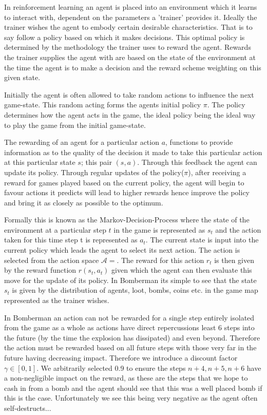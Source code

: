 In reinforcement learning an agent is placed into an environment which it learns to interact with, dependent on the parameters a 'trainer' provides it. Ideally the trainer wishes the agent to embody certain desirable characteristics. That is to say follow a policy based on which it makes decisions. This optimal policy is determined by the methodology the trainer uses to reward the agent. Rewards the trainer supplies the agent with are based on the state of the environment at the time the agent is to make a decision and the reward scheme weighting on this given state. 

Initially the agent is often allowed to take random actions to influence the next game-state. This random acting forms the agents initial policy $\pi$. The policy determines how the agent acts in the game, the ideal policy being the ideal way to play the game from the initial game-state.

The rewarding of an agent for a particular action $a$, functions to provide information as to the quality of the decision it made to take this particular action at this particular state $s$; this  pair $(s, a)$. Through this feedback the agent can update its policy. Through regular updates of the policy($\pi$), after receiving a reward for games played based on the current policy, the agent will begin to favour actions it predicts will lead to higher rewards hence improve the policy and bring it as closely as possible to the optimum.

Formally this is known as the Markov-Decision-Process where the state of the environment at a particular step $t$ in the game is represented as $s_t$ and the action taken for this time step t is represented as $a_t$. The current state is input into the current policy which leads the agent to select its next action. The action is selected from the action space $\mathcal{A} = $. The reward for this action $r_t$ is then given by the reward function $r(s_t, a_t)$ given which the agent can then evaluate this move for the update of its policy. In Bomberman its simple to see that the state $s_t$ is given by the distribution of agents, loot, bombs, coins etc. in the game map represented as the trainer wishes. 

In Bomberman an action can not be rewarded for a single step entirely isolated from the game as a whole as actions have direct repercussions least 6 steps into the future (by the time the explosion has dissipated) and even beyond. Therefore the action must be rewarded based on all future steps with those very far in the future having decreasing impact. Therefore we introduce a discount factor $\gamma \in [0, 1]$. We arbitrarily selected 0.9 to ensure the steps $n+4, n+5, n+6$ have a non-negligible impact on the reward, as these are the steps that we hope to cash in from a bomb and the agent should see that this was a well placed bomb if this is the case. Unfortunately we see this being very negative as the agent often self-destructs...

